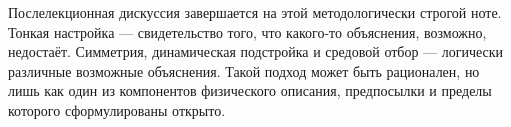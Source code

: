 \begin{classroomqa}
\end{classroomqa}

Послелекционная дискуссия завершается на этой методологически строгой ноте. Тонкая настройка — свидетельство того, что какого-то объяснения, возможно, недостаёт. Симметрия, динамическая подстройка и средовой отбор — логически различные возможные объяснения. Такой подход может быть рационален, но лишь как один из компонентов физического описания, предпосылки и пределы которого сформулированы открыто.
